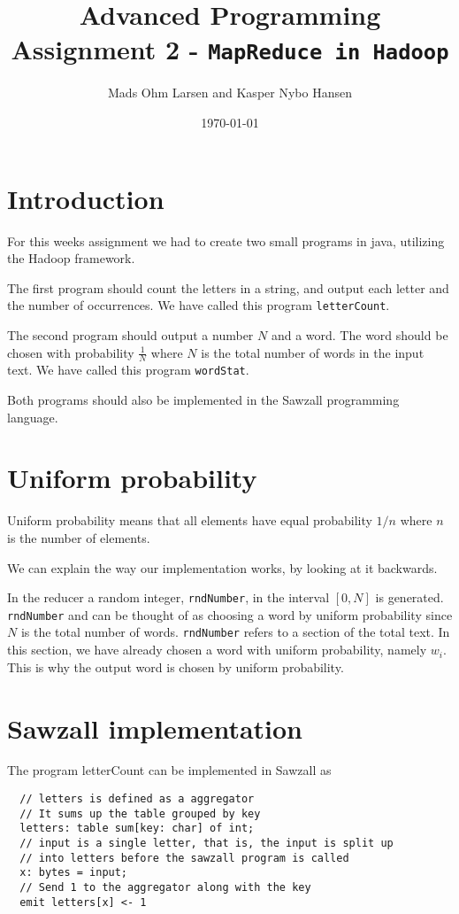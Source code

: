 \documentclass[10pt, a4paper]{article}
\title{Advanced Programming \\\small{Assignment 2} - \texttt{MapReduce in Hadoop}}
\author{Mads Ohm Larsen and Kasper Nybo Hansen}
\date{\today}
\begin{document}
	
\maketitle

\section{Introduction} %
\label{sec:introduction}
For this weeks assignment we had to create two small programs in java, utilizing the Hadoop framework. 

The first program should count the letters in a string, and output each letter and the number of occurrences. We have called this program \texttt{letterCount}.


The second program should output a number $N$ and a word. The word should be chosen with probability $\frac{1}{N}$ where $N$ is the total number of words in the input text. We have called this program \texttt{wordStat}.

Both programs should also be implemented in the Sawzall programming language.

\section{Uniform probability} %
\label{sec:uniform_probability}
Uniform probability means that all elements have equal probability $1/n$ where $n$ is the number of elements.

We can explain the way our implementation works, by looking at it backwards. 

In the reducer a random integer, \texttt{rndNumber}, in the interval $[0,N]$ is generated. \texttt{rndNumber} and can be thought of as choosing a word by uniform probability since $N$ is the total number of words. \texttt{rndNumber} refers to a section of the total text. In this section, we have already chosen a word with uniform probability, namely $w_i$. This is why the output word is chosen by uniform probability.



\section{Sawzall implementation} %
\label{sec:sawzall_implementation}
The program letterCount can be implemented in Sawzall as 


\begin{lstlisting}
  // letters is defined as a aggregator
  // It sums up the table grouped by key
  letters: table sum[key: char] of int;
  // input is a single letter, that is, the input is split up 
  // into letters before the sawzall program is called
  x: bytes = input;
  // Send 1 to the aggregator along with the key
  emit letters[x] <- 1  
\end{lstlisting}
\end{document}
